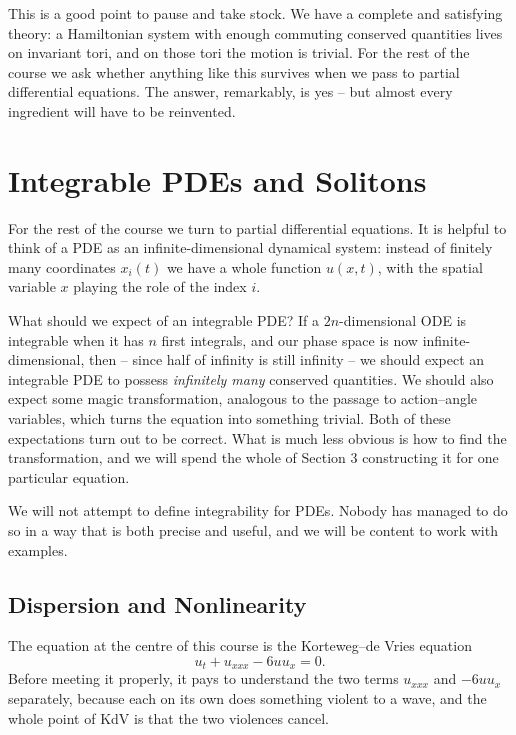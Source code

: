 This is a good point to pause and take stock. We have a complete and satisfying theory: a Hamiltonian system with enough commuting conserved quantities lives on invariant tori, and on those tori the motion is trivial. For the rest of the course we ask whether anything like this survives when we pass to partial differential equations. The answer, remarkably, is yes -- but almost every ingredient will have to be reinvented.

\section{Integrable PDEs and Solitons}

For the rest of the course we turn to partial differential equations. It is helpful to think of a PDE as an infinite-dimensional dynamical system: instead of finitely many coordinates $x_i(t)$ we have a whole function $u(x,t)$, with the spatial variable $x$ playing the role of the index $i$.

What should we expect of an integrable PDE? If a $2n$-dimensional ODE is integrable when it has $n$ first integrals, and our phase space is now infinite-dimensional, then -- since half of infinity is still infinity -- we should expect an integrable PDE to possess \emph{infinitely many} conserved quantities. We should also expect some magic transformation, analogous to the passage to action--angle variables, which turns the equation into something trivial. Both of these expectations turn out to be correct. What is much less obvious is how to find the transformation, and we will spend the whole of Section 3 constructing it for one particular equation.

We will not attempt to define integrability for PDEs. Nobody has managed to do so in a way that is both precise and useful, and we will be content to work with examples.

\subsection{Dispersion and Nonlinearity}

The equation at the centre of this course is the Korteweg--de Vries equation
$$
u_t + u_{xxx} - 6uu_x = 0.
$$
Before meeting it properly, it pays to understand the two terms $u_{xxx}$ and $-6uu_x$ separately, because each on its own does something violent to a wave, and the whole point of KdV is that the two violences cancel.

